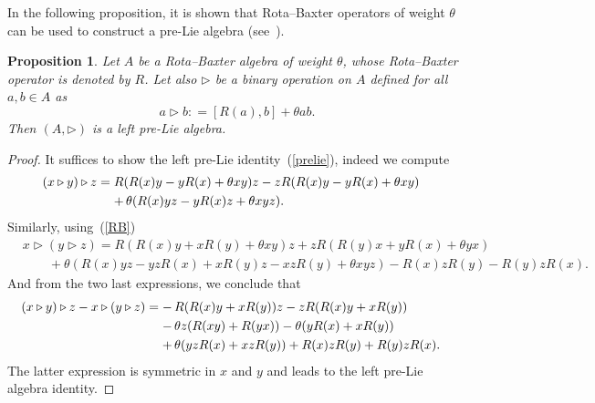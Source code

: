 \documentclass[10pt,a4paper]{amsart}
\numberwithin{equation}{section}
\newtheorem{pro}[thm]{Proposition}
\theoremstyle{definition}
\def\mathcal#1{#1}%
\begin{document}
In the following proposition, it is shown that Rota--Baxter operators of weight $\theta$ can be used to construct a pre-Lie algebra (see~\cite{Fer, EbraMan}).
\begin{pro}\label{pro1-1}
Let ${\mathcal A}$ be a Rota--Baxter
algebra of weight $\theta$, whose Rota--Baxter operator is denoted by $R$. Let also $\triangleright$ be a
binary operation on ${\mathcal A}$ defined for all $a,b\in \mathcal{A}$ as
\begin{equation*}
 a\triangleright b : = [R(a), b ] + \theta a b. %
\end{equation*}
Then $(\mathcal{A}, \triangleright)$ is a left pre-Lie algebra.
\end{pro}
\begin{proof}
It suffices to show the left pre-Lie identity~(\ref{prelie}), indeed we compute
\begin{align}
(x\triangleright y) \triangleright z={}& R (R(x)y - y R(x) + \theta xy )z -z R (R(x)y - yR(x) +\theta xy ) \cr
&{}{+}\, \theta (R(x)yz - yR(x)z + \theta xyz ). \label{rel1}
\end{align}
Similarly, using~(\ref{RB})
\begin{align}
&x\triangleright (y \triangleright z) =R (R(x)y+x R(y) + \theta xy )z +z R (R(y)x +yR(x) +\theta yx ) \label{rel1b}\\
&\qquad{}+ \theta (R(x)yz - yzR(x) + xR(y)z -xzR(y) +\theta xyz ) -R(x)zR(y)- R(y)z R(x). \nonumber
\end{align}
And from the two last expressions, we conclude that
\begin{align*}
(x\triangleright y) \triangleright z - x\triangleright (y \triangleright z) ={}&{-}\,
R (R(x) y + xR(y) )z - zR (R(x) y + xR(y) )\cr
&{-}\,\theta z (R(xy) + R(yx) ) -
\theta (y R(x) + x R(y) ) \cr
&{+}\, \theta (y z R(x) + xzR(y) ) + R(x)zR(y) + R(y)z R(x). %
\end{align*}
The latter expression is symmetric in $x$ and $y$ and leads to the left pre-Lie algebra identity.
\end{proof}
\end{document}
